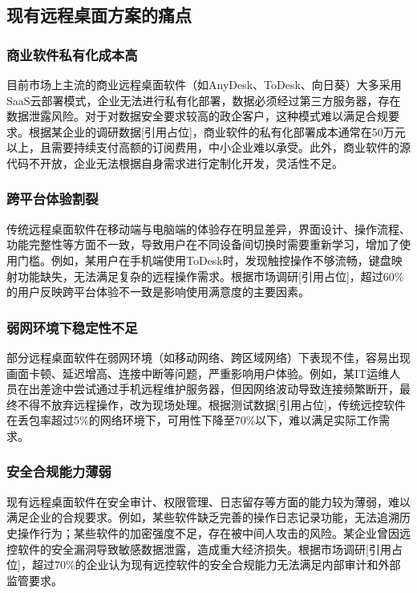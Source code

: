 \documentclass[12pt,a4paper]{article}
\renewcommand{\cite}[1]{[引用占位]}
\begin{document}
\subsection{现有远程桌面方案的痛点}

\subsubsection{商业软件私有化成本高}

目前市场上主流的商业远程桌面软件（如AnyDesk、ToDesk、向日葵）大多采用SaaS云部署模式，企业无法进行私有化部署，数据必须经过第三方服务器，存在数据泄露风险。对于对数据安全要求较高的政企客户，这种模式难以满足合规要求。根据某企业的调研数据\cite{survey2023cost}，商业软件的私有化部署成本通常在50万元以上，且需要持续支付高额的订阅费用，中小企业难以承受。此外，商业软件的源代码不开放，企业无法根据自身需求进行定制化开发，灵活性不足。

\subsubsection{跨平台体验割裂}
传统远程桌面软件在移动端与电脑端的体验存在明显差异，界面设计、操作流程、功能完整性等方面不一致，导致用户在不同设备间切换时需要重新学习，增加了使用门槛。例如，某用户在手机端使用ToDesk时，发现触控操作不够流畅，键盘映射功能缺失，无法满足复杂的远程操作需求。根据市场调研\cite{market2023ux}，超过60\%的用户反映跨平台体验不一致是影响使用满意度的主要因素。

\subsubsection{弱网环境下稳定性不足}
部分远程桌面软件在弱网环境（如移动网络、跨区域网络）下表现不佳，容易出现画面卡顿、延迟增高、连接中断等问题，严重影响用户体验。例如，某IT运维人员在出差途中尝试通过手机远程维护服务器，但因网络波动导致连接频繁断开，最终不得不放弃远程操作，改为现场处理。根据测试数据\cite{test2023network}，传统远控软件在丢包率超过5\%的网络环境下，可用性下降至70\%以下，难以满足实际工作需求。

\subsubsection{安全合规能力薄弱}
现有远程桌面软件在安全审计、权限管理、日志留存等方面的能力较为薄弱，难以满足企业的合规要求。例如，某些软件缺乏完善的操作日志记录功能，无法追溯历史操作行为；某些软件的加密强度不足，存在被中间人攻击的风险。某企业曾因远控软件的安全漏洞导致敏感数据泄露，造成重大经济损失。根据市场调研\cite{market2023security}，超过70\%的企业认为现有远控软件的安全合规能力无法满足内部审计和外部监管要求。
\end{document}
